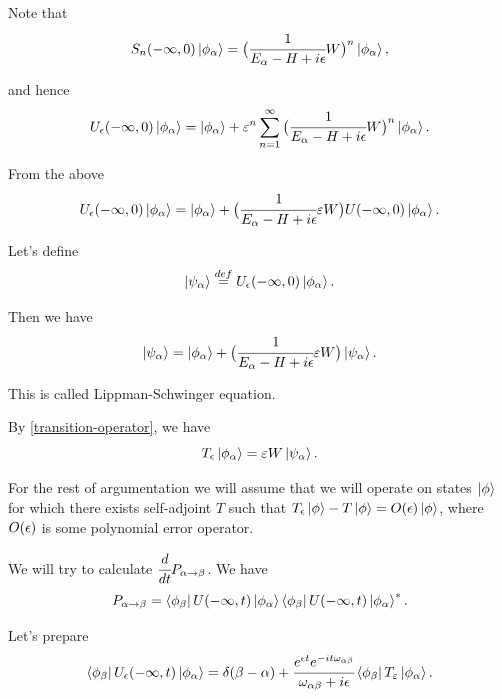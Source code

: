 \documentclass[main.tex]{subfiles}
\begin{document}
Note that
\begin{equation}
S_n (-\infty, 0) \ket{\phi_\alpha} =  \big(\cfrac{1}{E_\alpha - H + i\eepsilon}W\big)^n \ket{\phi_\alpha},
\end{equation}

and hence
\begin{equation}
U_\eepsilon(-\infty, 0) \ket{\phi_\alpha} = \ket{\phi_\alpha} + \epsilon^n \sum_{n=1}^\infty \big(\cfrac{1}{E_\alpha - H + i\eepsilon}W\big)^n \ket{\phi_\alpha}.
\end{equation}

From the above
\begin{equation}
U_\eepsilon(-\infty, 0) \ket{\phi_\alpha} = \ket{\phi_\alpha} + \big(\cfrac{1}{E_\alpha - H + i\eepsilon}\epsilon W\big)U(-\infty, 0) \ket{\phi_\alpha}.
\end{equation}

Let's define
\begin{equation}
\ket{\psi_\alpha} \stackrel{def}{=} U_\eepsilon(-\infty, 0) \ket{\phi_\alpha}.
\end{equation}

Then we have
\begin{equation}
\ket{\psi_\alpha} = \ket{\phi_\alpha} + \big(\cfrac{1}{E_\alpha - H + i\eepsilon}\epsilon W\big)\ket{\psi_\alpha}.
\end{equation}

This is called Lippman-Schwinger equation.

By \ref{transition-operator}, we have
\begin{equation}
T_{\eepsilon}\ket{\phi_\alpha} = \epsilon W \ket{\psi_\alpha}. 
\end{equation}

For the rest of argumentation we will assume that we will operate on states $\ket{\phi}$ for which there exists self-adjoint $T$ such that 
$T_{\eepsilon}\ket{\phi} - T\ket{\phi} = O(\eepsilon)\ket{\phi}$, 
where $O(\eepsilon)$ is some polynomial error operator.

We will try to calculate $\cfrac{d}{dt} P_{\alpha\to\beta}$. We have
\begin{equation}
P_{\alpha\to\beta} = \bra{\phi_\beta}U (-\infty, t) \ket{\phi_\alpha}\bra{\phi_\beta}U (-\infty, t) \ket{\phi_\alpha}^*.
\end{equation}

Let's prepare
\begin{equation}
\bra{\phi_\beta}U_\eepsilon (-\infty, t) \ket{\phi_\alpha} = \delta(\beta - \alpha) + \cfrac{e^{\eepsilon t}e^{-it\omega_{\alpha\beta}}}{\omega_{\alpha\beta}+i\eepsilon } \bra{\phi_\beta}T_\epsilon \ket{\phi_\alpha}.
\end{equation}
\end{document}
